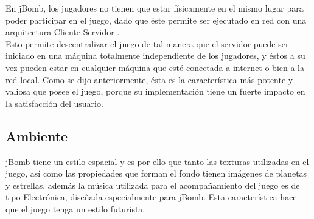 \documentclass[a4paper,12pt,openany,oneside]{book}
\begin{document}
En jBomb, los jugadores no tienen que estar físicamente en el mismo lugar para poder participar en el juego, dado que éste permite ser ejecutado en red con una arquitectura Cliente-Servidor \cite{VALVE1}.\\
Esto permite descentralizar el juego de tal manera que el servidor puede ser iniciado en una máquina totalmente independiente de los jugadores, y éstos a su vez pueden estar en cualquier máquina que esté conectada a internet o bien a la red local. Como se dijo anteriormente, ésta es la característica más potente y valiosa que posee el juego, porque su implementación tiene un fuerte impacto en la satisfacción del usuario.
\subsection{Ambiente}
jBomb tiene un estilo espacial y es por ello que tanto las texturas \cite{GB} utilizadas en el juego, así como las propiedades que forman el fondo tienen imágenes de planetas y estrellas, además la música utilizada para el acompañamiento del juego es de tipo Electrónica, diseñada especialmente para jBomb. Esta característica hace que el juego tenga un estilo futurista.
\end{document}
